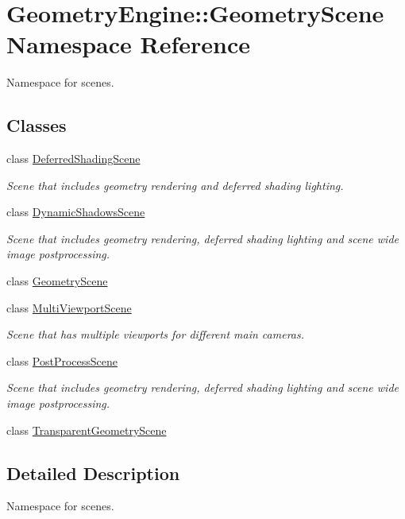 \hypertarget{namespace_geometry_engine_1_1_geometry_scene}{}\section{Geometry\+Engine\+::Geometry\+Scene Namespace Reference}
\label{namespace_geometry_engine_1_1_geometry_scene}


Namespace for scenes.  


\subsection*{Classes}
\begin{DoxyCompactItemize}
\item 
class \mbox{\hyperlink{class_geometry_engine_1_1_geometry_scene_1_1_deferred_shading_scene}{Deferred\+Shading\+Scene}}
\begin{DoxyCompactList}\small\item\em Scene that includes geometry rendering and deferred shading lighting. \end{DoxyCompactList}\item 
class \mbox{\hyperlink{class_geometry_engine_1_1_geometry_scene_1_1_dynamic_shadows_scene}{Dynamic\+Shadows\+Scene}}
\begin{DoxyCompactList}\small\item\em Scene that includes geometry rendering, deferred shading lighting and scene wide image postprocessing. \end{DoxyCompactList}\item 
class \mbox{\hyperlink{class_geometry_engine_1_1_geometry_scene_1_1_geometry_scene}{Geometry\+Scene}}
\item 
class \mbox{\hyperlink{class_geometry_engine_1_1_geometry_scene_1_1_multi_viewport_scene}{Multi\+Viewport\+Scene}}
\begin{DoxyCompactList}\small\item\em Scene that has multiple viewports for different main cameras. \end{DoxyCompactList}\item 
class \mbox{\hyperlink{class_geometry_engine_1_1_geometry_scene_1_1_post_process_scene}{Post\+Process\+Scene}}
\begin{DoxyCompactList}\small\item\em Scene that includes geometry rendering, deferred shading lighting and scene wide image postprocessing. \end{DoxyCompactList}\item 
class \mbox{\hyperlink{class_geometry_engine_1_1_geometry_scene_1_1_transparent_geometry_scene}{Transparent\+Geometry\+Scene}}
\end{DoxyCompactItemize}


\subsection{Detailed Description}
Namespace for scenes. 